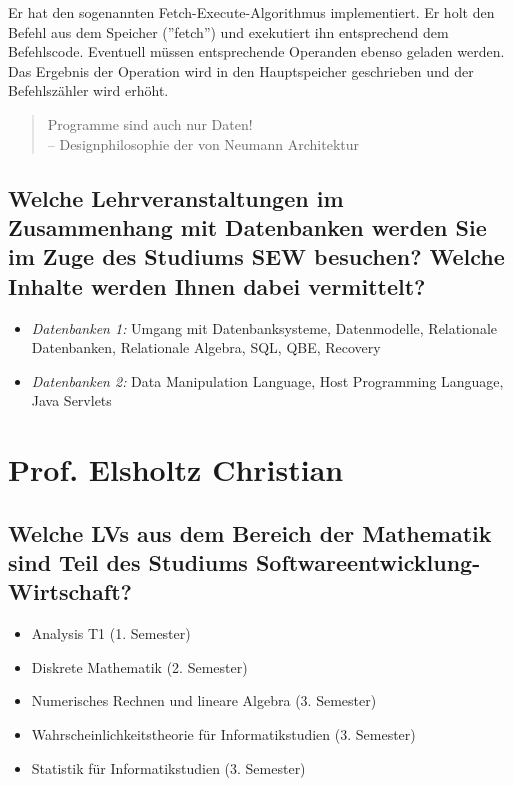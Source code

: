 Er hat den sogenannten Fetch-Execute-Algorithmus implementiert.
Er holt den Befehl aus dem Speicher (''fetch'') und exekutiert ihn
entsprechend dem Befehlscode. Eventuell müssen entsprechende Operanden
ebenso geladen werden. Das Ergebnis der Operation wird in den Hauptspeicher
geschrieben und der Befehlszähler wird erhöht.

\begin{quote}
  Programme sind auch nur Daten! \\
  -- Designphilosophie der von Neumann Architektur
\end{quote}

\subsection{Welche Lehrveranstaltungen im Zusammenhang mit Datenbanken
    werden Sie im Zuge des Studiums SEW besuchen? Welche Inhalte werden
    Ihnen dabei vermittelt?}

\begin{itemize}
  \item \emph{Datenbanken 1:} Umgang mit Datenbanksysteme, Datenmodelle,
    Relationale Datenbanken, Relationale Algebra, SQL, QBE, Recovery
  \item \emph{Datenbanken 2:} Data Manipulation Language, Host Programming
    Language, Java Servlets
\end{itemize}

\section{Prof. Elsholtz Christian}

\subsection{Welche LVs aus dem Bereich der Mathematik sind Teil des
    Studiums Softwareentwicklung-Wirtschaft?}

\begin{itemize}
  \item Analysis T1 (1. Semester)
  \item Diskrete Mathematik (2. Semester)
  \item Numerisches Rechnen und lineare Algebra (3. Semester)
  \item Wahrscheinlichkeitstheorie für Informatikstudien (3. Semester)
  \item Statistik für Informatikstudien (3. Semester)
\end{itemize}

